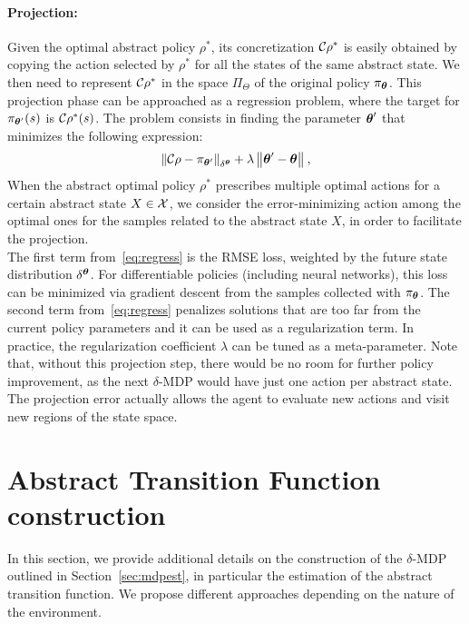 \paragraph{Projection:}
Given the optimal abstract policy $\rho^*$, its concretization $\Conc\rho^*$ is easily obtained by copying the action selected by $\rho^{*}$ for all the states of the same abstract state. We then need to represent $\Conc\rho^{*}$ in the space $\Pi_{\Theta}$ of the original policy $\pi_{\vtheta}$. This projection phase can be approached as a regression problem, where the target for $\pi_{\vtheta'}(s)$ is $\Conc\rho^*(s)$. The problem consists in finding the parameter $\vtheta'$ that minimizes the following expression:
\begin{align}\label{eq:regress}
\norm[\delta^{\vtheta}]{\Conc\rho - \pi_{\vtheta'}} 
+ \lambda\norm{\vtheta'-\vtheta},
\end{align} 
When the abstract optimal policy $\rho^{*}$ prescribes multiple optimal actions for a certain abstract state $X \in \Xspace$, we consider the error-minimizing action among the optimal ones for the samples related to the abstract state $X$, in order to facilitate the projection.\\
\newline
The first term from~\eqref{eq:regress} is the \acf{RMSE} loss, weighted by the future state distribution $\delta^{\vtheta}$. For differentiable policies (including neural networks), this loss can be minimized via gradient descent from the samples collected with $\pi_{\vtheta}$. The second term from~\eqref{eq:regress} penalizes solutions that are too far from the current policy parameters and it can be used as a regularization term. In practice, the regularization coefficient $\lambda$ can be tuned as a meta-parameter. Note that, without this projection step, there would be no room for further policy improvement, as the next $\delta$-\ac{MDP} would have just one action per abstract state. The projection error actually allows the agent to evaluate new actions and visit new regions of the state space. 

\section{Abstract Transition Function construction}\label{sec:absmdp}
In this section, we provide additional details on the construction of the $\delta$-MDP outlined in Section~\ref{sec:mdpest}, in particular \wrt the estimation of the abstract transition function. We propose different approaches depending on the nature of the environment.

